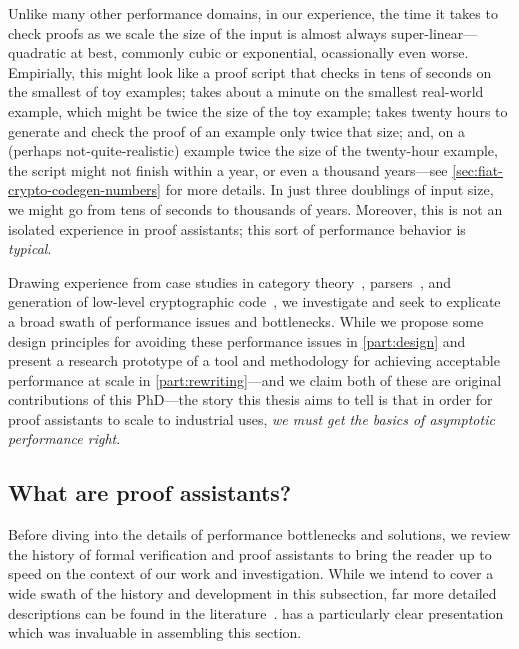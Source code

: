 Unlike many other performance domains, in our experience, the time it takes to check proofs as we scale the size of the input is almost always super-linear---quadratic at best, commonly cubic or exponential, ocassionally even worse.
Empirially, this might look like a proof script that checks in tens of seconds on the smallest of toy examples; takes about a minute on the smallest real-world example, which might be twice the size of the toy example; takes twenty hours to generate and check the proof of an example only twice that size; and, on a (perhaps not-quite-realistic) example twice the size of the twenty-hour example, the script might not finish within a year, or even a thousand years---see \autoref{sec:fiat-crypto-codegen-numbers} for more details.
In just three doublings of input size, we might go from tens of seconds to thousands of years.
Moreover, this is not an isolated experience in proof assistants; this sort of performance behavior is \emph{typical}.

Drawing experience from case studies in category theory~\cite{category-coq-experience}, parsers~\cite{jgross-masters-thesis}, and generation of low-level cryptographic code~\cite{FiatCryptoSP19}, we investigate and seek to explicate a broad swath of performance issues and bottlenecks.
While we propose some design principles for avoiding these performance issues in \autoref{part:design} and present a research prototype of a tool and methodology for achieving acceptable performance at scale in \autoref{part:rewriting}---and we claim both of these are original contributions of this PhD---the story this thesis aims to tell is that in order for proof assistants to scale to industrial uses, \emph{we must get the basics of asymptotic performance right}.

\subsection{What are proof assistants?}\label{sec:intro:history}
Before diving into the details of performance bottlenecks and solutions, we review the history of formal verification and proof assistants to bring the reader up to speed on the context of our work and investigation.
While we intend to cover a wide swath of the history and development in this subsection, far more detailed descriptions can be found in the literature~\cites{ringer2020qed,Proof2009Geuvers,History2014Harrison,CoqArtForward2013Huet,Brief2019Darbari,davis2001early,Matuszewski05mizar:the,Automath2002Kamareddine,Milestones2019Moore,Automation2013Moore,LCF2000Gordon,LCF2019Paulson}[Related Work]{nuprl}.
\textcite[ch.~4]{ringer2020qed} has a particularly clear presentation which was invaluable in assembling this section.

